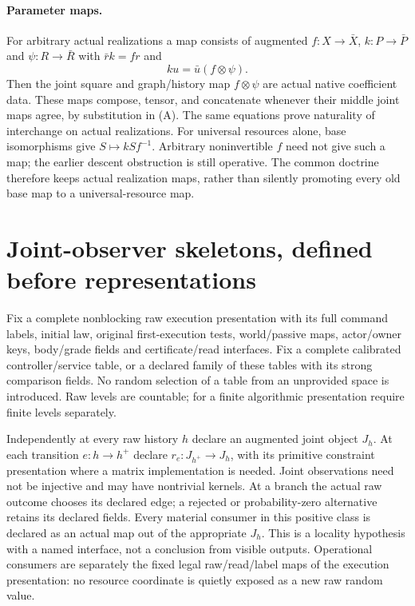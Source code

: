 \documentclass{article}
\begin{document}
\paragraph{Parameter maps.}
For arbitrary actual realizations a map consists of augmented $f:X\to\bar X$, $k:P\to\bar P$ and $\psi:R\to\bar R$ with $\bar r k=fr$ and
\[
 ku=\bar u(f\otimes\psi).\tag{A}
\]
Then the joint square and graph/history map $f\otimes\psi$ are actual native coefficient data. These maps compose, tensor, and concatenate whenever their middle joint maps agree, by substitution in (A). The same equations prove naturality of interchange on actual realizations. For universal resources alone, base isomorphisms give $S\mapsto kSf^{-1}$. Arbitrary noninvertible $f$ need not give such a map; the earlier descent obstruction is still operative. The common doctrine therefore keeps actual realization maps, rather than silently promoting every old base map to a universal-resource map.

\section{Joint-observer skeletons, defined before representations}
Fix a complete nonblocking raw execution presentation with its full command labels, initial law, original first-execution tests, world/passive maps, actor/owner keys, body/grade fields and certificate/read interfaces. Fix a complete calibrated controller/service table, or a declared family of these tables with its strong comparison fields. No random selection of a table from an unprovided space is introduced. Raw levels are countable; for a finite algorithmic presentation require finite levels separately.

Independently at every raw history $h$ declare an augmented joint object $J_h$. At each transition $e:h\to h^+$ declare $r_e:J_{h^+}\to J_h$, with its primitive constraint presentation where a matrix implementation is needed. Joint observations need not be injective and may have nontrivial kernels. At a branch the actual raw outcome chooses its declared edge; a rejected or probability-zero alternative retains its declared fields. Every material consumer in this positive class is declared as an actual map out of the appropriate $J_h$. This is a locality hypothesis with a named interface, not a conclusion from visible outputs. Operational consumers are separately the fixed legal raw/read/label maps of the execution presentation: no resource coordinate is quietly exposed as a new raw random value.
\end{document}
